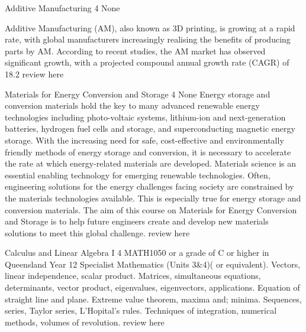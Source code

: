	{Additive Manufacturing}
	{4}
	{None}
	{}
	{}
	{Additive Manufacturing (AM), also known as 3D printing, is growing at a rapid rate, with global manufacturers increasingly realising the benefits of producing parts by AM. According to recent studies, the AM market has observed significant growth, with a projected compound annual growth rate (CAGR) of 18.2%
	{review here}

	{Materials for Energy Conversion and Storage}
	{4}
	{None}
	{}
	{}
	{Energy storage and conversion materials hold the key to many advanced renewable energy technologies including photo-voltaic systems, lithium-ion and next-generation batteries, hydrogen fuel cells and storage, and superconducting magnetic energy storage. With the increasing need for safe, cost-effective and environmentally friendly methods of energy storage and conversion, it is necessary to accelerate the rate at which energy-related materials are developed. Materials science is an essential enabling technology for emerging renewable technologies. Often, engineering solutions for the energy challenges facing society are constrained by the materials technologies available. This is especially true for energy storage and conversion materials. The aim of this course on Materials for Energy Conversion and Storage is to help future engineers create and develop new materials solutions to meet this global challenge.}
	{review here}

	{Calculus and Linear Algebra I}
	{4}
	{MATH1050 or a grade of C or higher in Queensland Year 12 Specialist Mathematics (Units 3&4)( or equivalent).}
	{}
	{}
	{Vectors, linear independence, scalar product. Matrices, simultaneous equations, determinants, vector product, eigenvalues, eigenvectors, applications. Equation of straight line and plane. Extreme value theorem, maxima and; minima. Sequences, series, Taylor series, L'Hopital's rules. Techniques of integration, numerical methods, volumes of revolution.}
	{review here}

}
